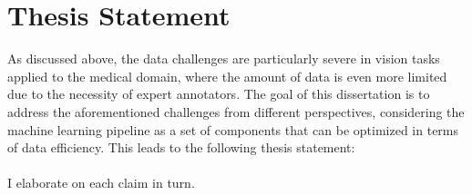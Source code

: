 \section{Thesis Statement}
As discussed above, the data challenges are particularly severe in vision tasks applied to the medical domain, where the amount of data is even more limited due to the necessity of expert annotators. The goal of this dissertation is to address the aforementioned challenges from different perspectives, considering the machine learning pipeline as a set of components that can be optimized in terms of data efficiency. This leads to the following thesis statement:
\\%

\textit{}
\\

I elaborate on each claim in turn.